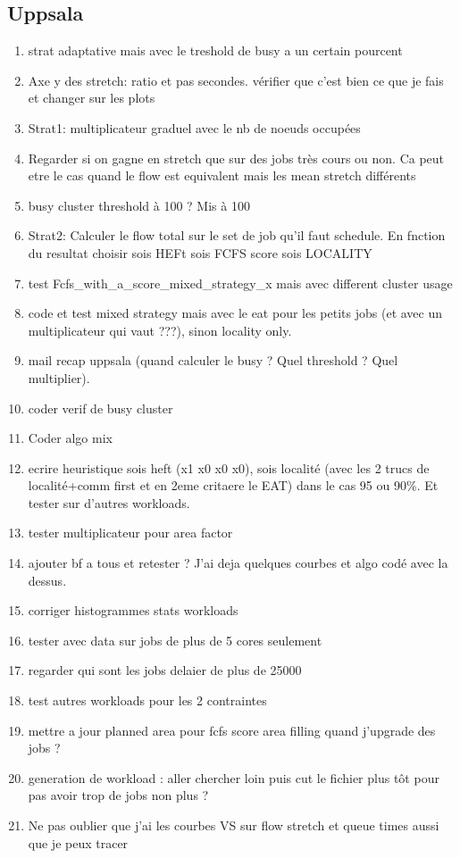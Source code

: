 \documentclass[a4paper]{article}
\begin{document}
	\subsection{Uppsala}
		\begin{enumerate}
			\item strat adaptative mais avec le treshold de busy a un certain pourcent
			\item Axe y des stretch: ratio et pas secondes. vérifier que c'est bien ce que je fais et changer sur les plots
			\item Strat1: multiplicateur graduel avec le nb de noeuds occupées
			\item Regarder si on gagne en stretch que sur des jobs très cours ou non. Ca peut etre le cas quand le flow est equivalent mais les mean stretch différents
			\item busy cluster threshold à 100 ? Mis à 100
			\item Strat2: Calculer le flow total sur le set de job qu'il faut schedule. En fnction du resultat choisir sois HEFt sois FCFS score sois LOCALITY
 			
			\item test Fcfs\_with\_a\_score\_mixed\_strategy\_x mais avec different cluster usage
			\item code et test mixed strategy mais avec le eat pour les petits jobs (et avec un multiplicateur qui vaut ???), sinon locality only.
			\item mail recap uppsala (quand calculer le busy ? Quel threshold ? Quel multiplier).
			\item coder verif de busy cluster
			\item Coder algo mix
			\item ecrire heuristique sois heft (x1 x0 x0 x0), sois localité (avec les 2 trucs de localité+comm first et en 2eme critaere le EAT) dans le cas 95 ou 90\%. Et tester sur d'autres workloads.
			\item tester multiplicateur pour area factor
			\item ajouter bf a tous et retester ? J'ai deja quelques courbes et algo codé avec la dessus.
			\item corriger histogrammes stats workloads
			\item tester avec data sur jobs de plus de 5 cores seulement
			\item regarder qui sont les jobs delaier de plus de 25000
			\item test autres workloads pour les 2 contraintes
			\item mettre a jour planned area pour fcfs score area filling quand j'upgrade des jobs ?
			\item generation de workload : aller chercher loin puis cut le fichier plus tôt pour pas avoir trop de jobs non plus ?
			\item Ne pas oublier que j'ai les courbes VS sur flow stretch et queue times aussi que je peux tracer						
		\end{enumerate}
\end{document}
